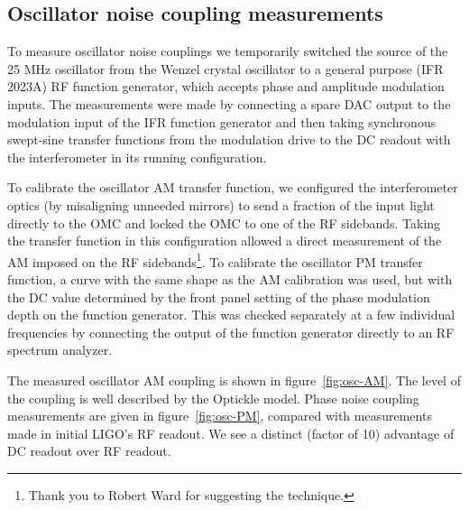 \subsection{Oscillator noise coupling measurements}

To measure oscillator noise couplings we temporarily switched the
source of the 25 MHz oscillator from the Wenzel crystal oscillator to
a general purpose (IFR 2023A) RF function generator, which accepts
phase and amplitude modulation inputs.  The measurements were made by
connecting a spare DAC output to the modulation input of the IFR
function generator and then taking synchronous swept-sine transfer
functions from the modulation drive to the DC readout with the
interferometer in its running configuration.

To calibrate the oscillator AM transfer function, we configured the
interferometer optics (by misaligning unneeded mirrors) to send a
fraction of the input light directly to the OMC and locked the OMC to
one of the RF sidebands.  Taking the transfer function in this
configuration allowed a direct measurement of the AM imposed on the RF
sidebands\footnote{Thank you to Robert Ward for suggesting the
  technique.}.  To calibrate the oscillator PM transfer function, a
curve with the same shape as the AM calibration was used, but with the
DC value determined by the front panel setting of the phase modulation
depth on the function generator.  This was checked separately at a few
individual frequencies by connecting the output of the function
generator directly to an RF spectrum analyzer.

The measured oscillator AM coupling is shown in
figure~\ref{fig:osc-AM}.  The level of the coupling is well described
by the Optickle model.  Phase noise coupling measurements are given in
figure~\ref{fig:osc-PM}, compared with measurements made in initial
LIGO's RF readout\cite{Smith2005Oscillator}.  We see a distinct
(factor of 10) advantage of DC readout over RF readout.

